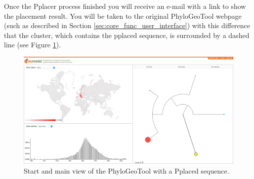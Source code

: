 \documentclass[a4paper, 11pt]{article} %
\begin{document}
Once the Pplacer process finished you will receive an e-mail with a link to show the placement result.
You will be taken to the original PhyloGeoTool webpage (such as described in Section \ref{sec:core_func_user_interface}) with this difference that the cluster, which contains the pplaced sequence, is surrounded by a dashed line (see Figure \ref{fig:pplacer-view}). 

\begin{figure}[H]
\centering
\includegraphics[scale=0.1875]{images/pplaced_sequence.png}
\vspace{-0.75cm}
\caption{Start and main view of the PhyloGeoTool with a Pplaced sequence.}
\label{fig:pplacer-view}
\end{figure}



\end{document}
